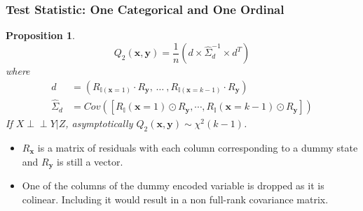 \documentclass{beamer}
\def\ci{\perp\!\!\!\!\!\perp}
\newtheorem{proposition}{Proposition}
\begin{document}
\begin{frame}
	\frametitle{Test Statistic: One Categorical and One Ordinal}
	\begin{proposition}

		$$ Q_2(\bm{x}, \bm{y}) = \frac{1}{n} (d \times \hat{\Sigma}_d^{-1} \times d^T) $$
	where
	\begin{equation*}
		\begin{split}
		d &= (R_{\mathbb{I}(\mathbf{x}=1)} \cdot R_{\mathbf{y}}, \, \ldots \ , R_{\mathbb{I}(\mathbf{x}=k-1)} \cdot R_{\mathbf{y}}) \\ 
		\hat{\Sigma}_d &= Cov([R_\mathbb{I}(\mathbf{x}=1) \odot R_\mathbf{y}, \cdots, R_\mathbb{I}(\mathbf{x}=k-1) \odot R_\mathbf{y}])
		\end{split}
	\end{equation*}
		If $ X \ci Y | Z $, asymptotically $ Q_2(\bm{x}, \bm{y}) \sim \chi^2(k-1) $.
	\end{proposition}
	\begin{center}
		\begin{itemize}
			\item $ R_{\bm{x}} $ is a matrix of residuals with each column corresponding to a dummy state and $ R_{\bm{y}} $ is still a vector.
			\item One of the columns of the dummy encoded variable
				is dropped as it is colinear. Including it would
				result in a non full-rank covariance matrix.
		\end{itemize}
	\end{center}
\end{frame}
\end{document}
